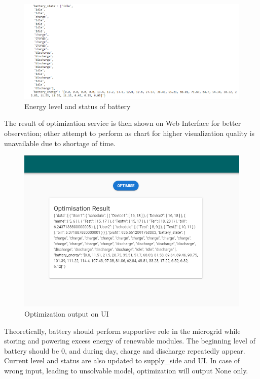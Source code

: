 \documentclass[runningheads]{llncs}
\begin{document}
\begin{figure}[H]
	\centering
	\includegraphics[width=1\columnwidth]{optimization.PNG}
	\caption{Energy level and status of battery}
	\label{img: optimized_bat}
\end{figure}
The result of optimization service is then shown on Web Interface for better observation; other attempt to perform as chart for higher visualization quality is unavailable due to shortage of time.
\begin{figure}[H]
	\centering
	\includegraphics[width=1\columnwidth]{optimization3.PNG}
	\caption{Optimization output on UI}
	\label{img: optimized_UI}
\end{figure}

Theoretically, battery should perform supportive role in the microgrid while storing and powering excess energy of renewable modules. The beginning level of battery should be 0, and during day, charge and discharge repeatedly appear. Current level and status are also updated to supply\_side and UI. In case of wrong input, leading to unsolvable model, optimization will output None only. 
\end{document}

